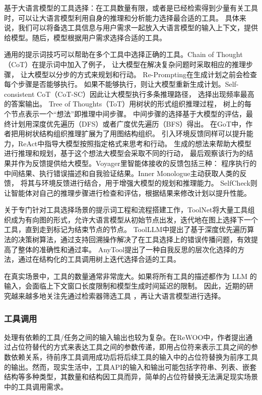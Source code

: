 基于大语言模型的工具选择：在工具数量有限，或者是已经检索得到少量有关工具时，可以让大语言模型利用自身的推理和分析能力选择最合适的工具。
具体来说，我们可以将备选工具信息与用户需求一起放入大语言模型的输入上下文，提供给模型。随后，模型根据用户需求选择合适的工具。

通用的提示词技巧可以帮助在多个工具中选择正确的工具。Chain of Thought（CoT）\cite{Wang2023a}在提示词中加入了例子，
让大模型在解决复杂问题时采取相应的推理步骤，
让大模型以分步的方式来规划和行动。
Re-Prompting\cite{Raman2022}在生成计划之前会检查每个步骤是否能够执行。
如果不能够执行，则让大模型重新生成计划。Self-consistent CoT（CoT-SC）\cite{wang2022self}因此让大模型执行多条推理路径，
选择出现频率最高的答案输出。
Tree of Thoughts（ToT）\cite{Yao2023a}用树状的形式组织推理过程，
树上的每个节点表示一个“想法”即推理中间步骤。
中间步骤的选择基于大模型的评估，最终计划用深度优先遍历（DFS）或者广度优先遍历（BFS）得出。
在GoT\cite{Besta2023}中，作者把用树状结构组织推理扩展为了用图结构组织。
引入环境反馈同样可以提升能力，ReAct\cite{Yao2023b}中指导大模型按照指定格式来思考和行动。
生成的想法来帮助大模型进行推理和规划，基于这个想法大模型会采取不同的行动，
最后观察该行为的结果并作为反馈提供给大模型。Voyager\cite{Wang2023b}里智能体接收的反馈包括三种：
程序执行的中间结果、执行错误描述和自我验证结果。Inner Monologue\cite{Huang2022}主动获取人类的反馈，
将其与环境反馈进行结合，用于增强大模型的规划和推理能力。
SelfCheck\cite{Miao2023}则让智能体对自己的推理步骤进行检查和评估，根据结果来修改计划以提升性能。

关于专门针对工具选择场景的提示词工程和流程搭建工作，ToolNet\cite{Liu2024}将大量工具组织成为有向图的形式，允许大语言模型从初始节点出发，迭代地在图上选择下一个工具，直到走到标记为结束节点的节点。
ToolLLM\cite{Qin2023}中提出了基于深度优先遍历算法的决策树算法，通过支持回溯操作解决了在工具选择上的错误传播问题，有效提高了整体的准确性和通过率。
AnyTool\cite{Du2024}提出了一种自我反思的层次化选择的方法，通过在结构化的工具调用树上迭代选择合适的工具。

在真实场景中，工具的数量通常非常庞大。如果将所有工具的描述都作为 LLM 的输入，会面临上下文窗口长度限制和模型生成时间延迟的限制。
因此，近期的研究越来越多地关注先通过检索器筛选工具\cite{Qin2023, anantha2023protip, Liu2024} ，再让大语言模型进行选择。

\subsubsection{工具调用}

处理有依赖的工具/任务之间的输入输出也较为复杂。在ReWOO中\cite{xu2023rewoo}，作者提出通过占位符替代的方式来表达工具之间的参数传递，即用占位符来表示工具之间的参数依赖关系，待前序工具调用成功后将后续工具的输入中的占位符替换为前序工具的输出。然而，现实生活中，工具API的输入和输出可能包括字符串、列表、嵌套结构等多种类型，其数量和结构因工具而异，简单的占位符替换无法满足现实场景中的工具调用需求。

